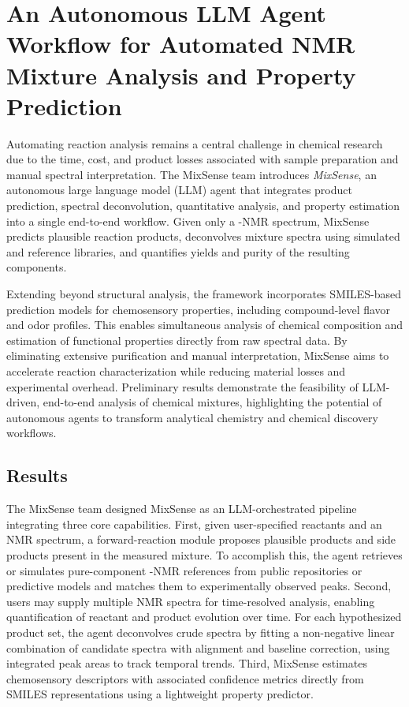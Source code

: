 \section{An Autonomous LLM Agent Workflow for Automated NMR Mixture Analysis and Property Prediction}

Automating reaction analysis remains a central challenge in chemical research due to the time, cost, and product losses associated with sample preparation and manual spectral interpretation. The MixSense team introduces \emph{MixSense}, an autonomous large language model (LLM) agent that integrates product prediction, spectral deconvolution, quantitative analysis, and property estimation into a single end-to-end workflow. Given only a -NMR spectrum, MixSense predicts plausible reaction products, deconvolves mixture spectra using simulated and reference libraries, and quantifies yields and purity of the resulting components.

Extending beyond structural analysis, the framework incorporates SMILES-based prediction models for chemosensory properties, including compound-level flavor and odor profiles. This enables simultaneous analysis of chemical composition and estimation of functional properties directly from raw spectral data. By eliminating extensive purification and manual interpretation, MixSense aims to accelerate reaction characterization while reducing material losses and experimental overhead. Preliminary results demonstrate the feasibility of LLM-driven, end-to-end analysis of chemical mixtures, highlighting the potential of autonomous agents to transform analytical chemistry and chemical discovery workflows.

\subsection*{Results}

The MixSense team designed MixSense as an LLM-orchestrated pipeline integrating three core capabilities. First, given user-specified reactants and an NMR spectrum, a forward-reaction module proposes plausible products and side products present in the measured mixture. To accomplish this, the agent retrieves or simulates pure-component -NMR references from public repositories or predictive models and matches them to experimentally observed peaks. Second, users may supply multiple NMR spectra for time-resolved analysis, enabling quantification of reactant and product evolution over time. For each hypothesized product set, the agent deconvolves crude spectra by fitting a non-negative linear combination of candidate spectra with alignment and baseline correction, using integrated peak areas to track temporal trends. Third, MixSense estimates chemosensory descriptors with associated confidence metrics directly from SMILES representations using a lightweight property predictor.

